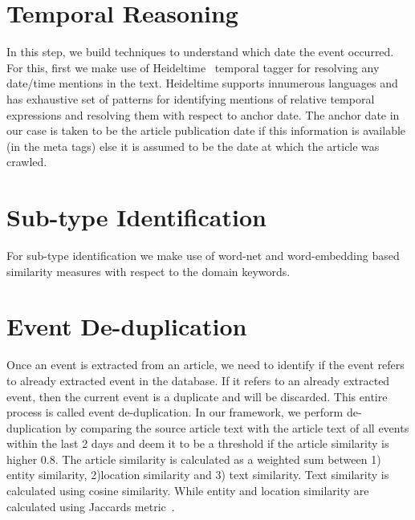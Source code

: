 \section{Temporal Reasoning}
In this step, we build techniques to understand which date the event occurred. For this, first we make use of Heideltime~\cite{heideltime} temporal tagger for resolving any date/time mentions in the text. Heideltime supports innumerous languages and has exhaustive set of patterns for identifying mentions of relative temporal expressions and resolving them with respect to anchor date. The anchor date in our case is taken to be the article publication date if this information is available (in the meta tags) else it is assumed to be the date at which the article was crawled.

\section{Sub-type Identification}
For sub-type identification we make use of word-net and word-embedding based similarity measures with respect to the domain keywords.

\section{Event De-duplication}
Once an event is extracted from an article, we need to identify if the event refers to already extracted event in the database. If it refers to an already extracted event, then the current event is a duplicate and will be discarded. This entire process is called event de-duplication. In our framework, we perform de-duplication by comparing the source article text with the article text of all events within the last 2 days and deem it to be a threshold if the article similarity is higher 0.8. The article similarity is calculated as a weighted sum between 1) entity similarity, 2)location similarity and 3) text similarity. Text similarity is calculated using cosine similarity. While entity and location similarity are calculated using Jaccards metric~\cite{jaccard}.